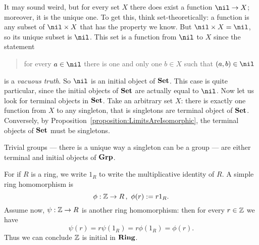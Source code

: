 \begin{example}
It may sound weird, but for every set \(X\) there does exist a function \(\nil \to X\); moreover, it is the unique one. To get this, think set-theoretically: a function is any subset of \(\nil \times X\) that has the property we know. But \(\nil \times X = \nil\), so its unique subset is \(\nil\). This set is a function from \(\nil\) to \(X\) since the statement
\begin{quotation}
for every \(a \in \nil\) there is one and only one \(b \in X\) such that \((a, b) \in \nil\)
\end{quotation}
is a {\em vacuous truth}.
So \(\nil\) is an initial object of \(\mathbf{Set}\). This case is quite particular, since the initial objects of \(\mathbf{Set}\) are actually equal to \(\nil\). \newline
Now let us look for terminal objects in \(\mathbf{Set}\). Take an arbitrary set \(X\): there is exactly one function from \(X\) to any singleton, that is singletons are terminal object of \(\mathbf{Set}\). Conversely, by Proposition~\ref{proposition:LimitsAreIsomorphic}, the terminal objects of \(\mathbf{Set}\) must be singletons.
\end{example}

\begin{exercise}
Trivial groups --- there is a unique way a singleton can be a group --- are either terminal and initial objects of \(\mathbf{Grp}\).
\end{exercise}

\begin{example}
For if \(R\) is a ring, we write \(1_R\) to write the multiplicative identity of \(R\). A simple ring homomorphism is
\[\phi : \mathbb Z \to R \,,\ \phi(r) := r 1_R .\]
Assume now, \(\psi : \mathbb Z \to R\) is another ring homomorphism: then for every \(r \in \mathbb Z\) we have
\[\psi(r) = r \psi\left(1_R\right) = r \phi\left(1_R\right) = \phi(r) .\]
Thus we can conclude \(\mathbb Z\) is initial in \(\mathbf{Ring}\).
\end{example}

